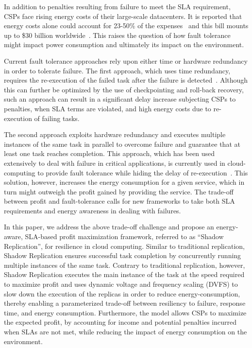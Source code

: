 In addition to penalties resulting from failure to meet the SLA
requirement, CSPs face rising energy costs of their large-scale
datacenters.  It is reported that energy costs alone could account
for 23-50\% of the expenses~\cite{Elnozahy03energyconservation} and
this bill mounts up to \$30 billion
worldwide~\cite{Raghavendra:2008:NPS}. This raises the question of how
fault tolerance might impact power consumption and ultimately its impact on the environment.

Current fault tolerance approaches rely upon either time or hardware
redundancy in order to tolerate failure. The first approach, which
uses time redundancy, requires the re-execution of the failed task
after the failure is detected~\cite{Gelenbe:1990:OPT}.
Although this can further be optimized
by the use of checkpointing and roll-back recovery, such an approach
can result in a significant delay increase subjecting CSPs to penalties, when SLA terms are violated,
and high energy costs due to re-execution of failing tasks. 



The second approach exploits hardware redundancy and executes multiple
instances of the same task in parallel to overcome failure and
guarantee that at least one task reaches completion.  This approach,
which has been used extensively to deal with failure in critical
applications, is currently used in cloud-computing to provide fault
tolerance while hiding the delay of
re-execution~\cite{tsai_isads_2011,ko_socc_2010}. This solution,
however, increases the energy consumption for a given service, which
in turn might outweigh the profit gained by providing the service.
The trade-off between profit and fault-tolerance calls for new
frameworks to take both SLA requirements and energy awareness in
dealing with failures.

In this paper, we address the above trade-off challenge and propose an
energy-aware, SLA-based profit maximization framework, referred to as
``Shadow Replication'', for resilience in cloud computing.  Similar to
traditional replication, Shadow Replication ensures successful task
completion by concurrently running multiple instances of the same
task. Contrary to traditional replication, however, Shadow Replication
executes the main instance of the task at the speed required to
maximize profit and uses dynamic voltage and frequency scaling (DVFS)
to slow down the execution of the replicas in order to reduce energy-consumption, thereby enabling a
parameterized trade-off between resiliency to failure, response time, and energy consumption. 
Furthermore, the model allows CSPs to maximize the expected profit,
by accounting for income and potential penalties incurred when SLAs are not met, while reducing the impact of energy consumption on the environment.

